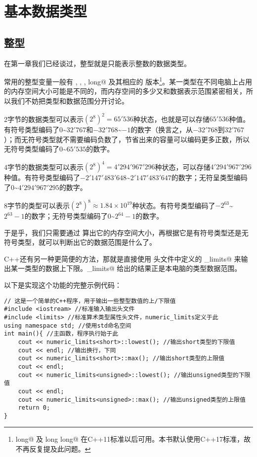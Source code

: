\section{基本数据类型}
\subsection*{整型}
在第一章我们已经谈过，整型就是只能表示整数的数据类型。\par
常用的整型变量一般有 \lstinline@short@, \lstinline@int@, \lstinline@long@, \lstinline@long long@ 及其相应的 \lstinline@unsigned@ 版本\footnote{\lstinline@long long@ 及 \lstinline@unsigned long long@ 在C++11标准以后可用。本书默认使用C++17标准，故不再反复提及此问题。}。某一类型在不同电脑上占用的内存空间大小可能是不同的，而内存空间的多少又和数据表示范围紧密相关，所以我们不妨把类型和数据范围分开讨论。\par
2字节的数据类型可以表示$(2^8)^2=65'536$种状态，也就是可以存储$65'536$种值。有符号类型编码了$0$\~{}$32'767$和$-32'768$\~{}$-1$的数字（换言之，从$-32'768$到$32'767$）；而无符号类型就不需要编码负数了，节省出来的容量可以编码更多正数，所以无符号类型编码了$0$\~{}$65'535$的数字。\par
4字节的数据类型可以表示$(2^8)^4=4'294'967'296$种状态，可以存储$4'294'967'296$种值。有符号类型编码了$-2'147'483'648$\~{}$2'147'483'647$的数字；无符呈类型编码了$0$\~{}$4'294'967'295$的数字。\par
8字节的类型可以表示$(2^8)^8\approx1.84\times10^{19}$种状态。有符号类型编码了$-2^{63}$\~{}$2^{63}-1$的数字；无符号类型编码了$0$\~{}$2^{64}-1$的数字。\par
于是乎，我们只需要通过 \lstinline@sizeof@ 算出它的内存空间大小，再根据它是有符号类型还是无符号类型，就可以判断出它的数据范围是什么了。\par
C++还有另一种更简便的方法，那就是直接使用 \lstinline@limits@ 头文件中定义的 \lstinline@numeric_limits@ 来输出某一类型的数据上下限。\lstinline@numeric_limits@ 给出的结果正是本电脑的类型数据范围。\par
以下是实现这个功能的完整示例代码：
\begin{lstlisting}[caption=\texttt{Integer\_Limits.cpp}]
// 这是一个简单的C++程序，用于输出一些整型数值的上/下限值
#include <iostream> //标准输入输出头文件
#include <limits> //标准算术类型属性头文件，numeric_limits定义于此
using namespace std; //使用std命名空间
int main(){ //主函数，程序执行始于此
    cout << numeric_limits<short>::lowest(); //输出short类型的下限值
    cout << endl; //输出换行，下同
    cout << numeric_limits<short>::max(); //输出short类型的上限值
    cout << endl;
    cout << numeric_limits<unsigned>::lowest(); //输出unsigned类型的下限值
    cout << endl;
    cout << numeric_limits<unsigned>::max(); //输出unsigned类型的上限值
    return 0;
}
\end{lstlisting}
